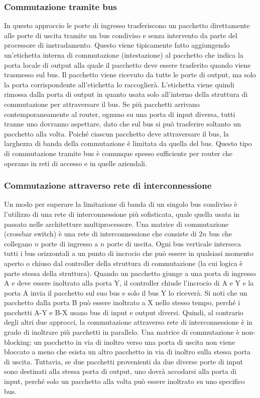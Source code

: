 \subsubsection{Commutazione tramite bus}
In questo approccio le porte di ingresso trasferiscono un pacchetto direttamente alle porte di uscita tramite un bus condiviso e senza intervento da parte del processore di instradamento. Questo viene tipicamente fatto aggiungendo un'etichetta interna di commutazione (intestazione) al pacchetto che indica la porta locale di output alla quale il pacchetto deve essere trasferito quando viene trasmesso sul bus. Il pacchetto viene ricevuto da tutte le porte di output, ma solo la porta corrispondente all'etichetta lo raccoglierà. L'etichetta viene quindi rimossa dalla porta di output in quanto usata solo all'interno della struttura di commutazione per attraversare il bus. Se più pacchetti arrivano contemporaneamente al router, ognuno su una porta di input diversa, tutti tranne uno dovranno aspettare, dato che sul bus si può trasferire soltanto un pacchetto alla volta. Poiché ciascun pacchetto deve attraversare il bus, la larghezza di banda della commutazione è limitata da quella del bus. Questo tipo di commutazione tramite bus è comunque spesso sufficiente per router che operano in reti di accesso e in quelle aziendali.

\subsubsection{Commutazione attraverso rete di interconnessione}
Un modo per superare la limitazione di banda di un singolo bus condiviso è l'utilizzo di una rete di interconnessione più sofisticata, quale quella usata in passato nelle architetture multiprocessore. Una matrice di commutazione (crossbar switch) è una rete di interconnessione che consiste di $2n$ bus che collegano $n$ porte di ingresso a $n$ porte di uscita. Ogni bus verticale interseca tutti i bus orizzontali a un punto di incrocio che può essere in qualsiasi momento aperto o chiuso dal controller della struttura di commutazione (la cui logica è parte stessa della struttura). Quando un pacchetto giunge a una porta di ingresso A e deve essere inoltrato alla porta Y, il controller chiude l'incrocio di A e Y e la porta A invia il pacchetto sul suo bus e solo il bus Y lo riceverà. Si noti che un pacchetto dalla porta B può essere inoltrato a X nello stesso tempo, perché i pacchetti A-Y e B-X usano bus di input e output diversi. Quindi, al contrario degli altri due approcci, la commutazione attraverso rete di interconnessione è in grado di inoltrare più pacchetti in parallelo. Una matrice di commutazione è non-blocking: un pacchetto in via di inoltro verso una porta di uscita non viene bloccato a meno che esista un altro pacchetto in via di inoltro sulla stessa porta di uscita. Tuttavia, se due pacchetti provenienti da due diverse porte di input sono destinati alla stessa porta di output, uno dovrà accodarsi alla porta di input, perché solo un pacchetto alla volta può essere inoltrato su uno specifico bus.


